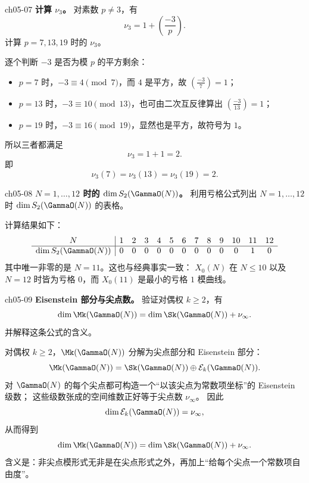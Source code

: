 \begin{problem}{ch05-07}
\textbf{计算 $\nu_3$。}
对素数 $p\neq 3$，有
\[
\nu_3=1+\left(\frac{-3}{p}\right).
\]
计算 $p=7,13,19$ 时的 $\nu_3$。
\end{problem}
\begin{solution}
逐个判断 $-3$ 是否为模 $p$ 的平方剩余：
\begin{itemize}
  \item $p=7$ 时，$-3\equiv 4\pmod7$，而 $4$ 是平方，故 $\left(\frac{-3}{7}\right)=1$；
  \item $p=13$ 时，$-3\equiv 10\pmod{13}$，也可由二次互反律算出 $\left(\frac{-3}{13}\right)=1$；
  \item $p=19$ 时，$-3\equiv 16\pmod{19}$，显然也是平方，故符号为 $1$。
\end{itemize}
所以三者都满足
\[
\nu_3=1+1=2.
\]
即
\[
\nu_3(7)=\nu_3(13)=\nu_3(19)=2.
\]
\end{solution}

\begin{problem}{ch05-08}
\textbf{$N=1,\dots,12$ 时的 $\dim S_2(\GammaO(N))$。}
利用亏格公式列出 $N=1,\dots,12$ 时 $\dim S_2(\GammaO(N))$ 的表格。
\end{problem}
\begin{solution}
计算结果如下：
\[
\begin{array}{c|cccccccccccc}
N&1&2&3&4&5&6&7&8&9&10&11&12\\ \hline
\dim S_2(\GammaO(N))&0&0&0&0&0&0&0&0&0&0&1&0
\end{array}
\]
其中唯一非零的是 $N=11$。这也与经典事实一致：
$X_0(N)$ 在 $N\le 10$ 以及 $N=12$ 时皆为亏格 $0$，而 $X_0(11)$ 是最小的亏格 $1$ 模曲线。
\end{solution}

\begin{problem}{ch05-09}
\textbf{Eisenstein 部分与尖点数。}
验证对偶权 $k\ge 2$，有
\[
\dim \Mk(\GammaO(N))=\dim \Sk(\GammaO(N))+\nu_\infty.
\]
并解释这条公式的含义。
\end{problem}
\begin{solution}
对偶权 $k\ge 2$，$\Mk(\GammaO(N))$ 分解为尖点部分和 Eisenstein 部分：
\[
\Mk(\GammaO(N))=\Sk(\GammaO(N))\oplus \mathcal E_k(\GammaO(N)).
\]
对 $\GammaO(N)$ 的每个尖点都可构造一个“以该尖点为常数项坐标”的 Eisenstein 级数；
这些级数张成的空间维数正好等于尖点数 $\nu_\infty$。
因此
\[
\dim \mathcal E_k(\GammaO(N))=\nu_\infty,
\]
从而得到
\[
\dim \Mk(\GammaO(N))=\dim \Sk(\GammaO(N))+\nu_\infty.
\]
含义是：非尖点模形式无非是在尖点形式之外，再加上“给每个尖点一个常数项自由度”。
\end{solution}

